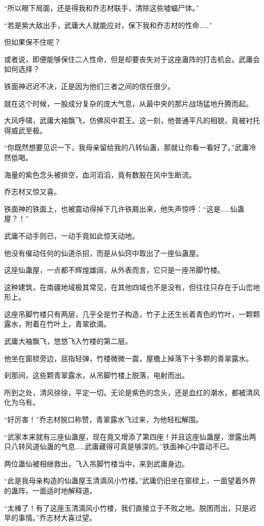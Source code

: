 \begin{this_body}
“所以眼下局面，还是得我和乔志材联手，清除这些墟蝠尸体。”

“若是紫大敌出手，武庸大人就能应对，保下我和乔志材的性命……”

但如果保不住呢？

或者说，即便能够保住二人性命，但是却要丧失对于这座蛊阵的打击机会。武庸会如何选择？

铁面神迟迟不决，正是因为他们三者之间的信任很少。

就在这个时候，一股成分复杂的庞大气息，从最中央的那片战场猛地升腾而起。

大风呼啸，武庸大袖飘飞，仿佛风中君王。这一刻，他普通平凡的相貌，竟被衬托得威武至极。

“你既然想要见识一下，我母亲留给我的八转仙蛊，那就让你看一看好了。”武庸冷然低喝。

海量的紫色念头被排空，血河滔滔，竟有数股在风中生断流。

乔志材又惊又喜。

铁面神的铁面上，也被震动得掉下几许铁屑出来，他失声惊呼：“这是……仙蛊屋？！”

武庸不动手则已，一动手竟如此惊天动地。

他没有催动任何的仙道杀招，而是从仙窍中取出了一座仙蛊屋。

这座仙蛊屋，一点都不辉煌雄阔，从外表而言，它只是一座吊脚竹楼。

这种建筑，在南疆地域极其常见，在其他四域也不是没有，但往往只存在于山峦地形上。

这座吊脚竹楼只有两层，几乎全是竹子构造，竹子上还生长着青色的竹叶，一颗颗露水，附着在竹叶上，青翠欲滴。

武庸大袖飘飞，悠悠飞入竹楼的第二层。

他坐在窗棂旁边，屈指轻弹，竹楼微微一震，屋檐上掉落下十多颗的青翠露水。

刹那间，这些颗青翠露水，从吊脚竹楼上脱落，电射而出。

所到之处，清风徐徐，平定一切。无论是紫色的念头，还是血红的潮水，都被清风化为乌有。

“好厉害！”乔志材脱口称赞，青翠露水飞过来，为他轻松解围。

“武家本来就有三座仙蛊屋，现在竟又增添了第四座！并且这座仙蛊屋，泄露出两只八转风道仙蛊的气息……武庸藏得可真是够深的。”铁面神心中震动不已。

两位蛊仙被相继救出，飞入吊脚竹楼当中，来到武庸身边。

“此是我母亲构造的仙蛊屋玉清滴风小竹楼。”武庸仍旧坐在窗棂上，一面望着外界的蛊阵，一面适时地解释道。

“太棒了！有了这座玉清滴风小竹楼，我们直接立于不败之地。脱困而出，只是迟早的事情。”乔志材大喜过望。


\end{this_body}

